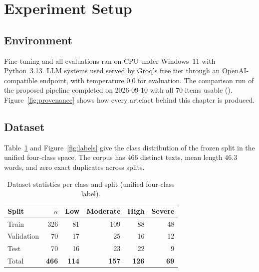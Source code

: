 
\section{Experiment Setup}
\subsection{Environment}
Fine-tuning and all evaluations ran on CPU under Windows~11 with Python~3.13. LLM systems used  served by Groq's free tier through an OpenAI-compatible endpoint, with temperature 0.0 for evaluation. The comparison run of the proposed pipeline completed on 2026-09-10 with all 70 items usable (). Figure~\ref{fig:provenance} shows how every artefact behind this chapter is produced.


\subsection{Dataset}
Table~\ref{tab:dataset} and Figure~\ref{fig:labels} give the class distribution of the frozen split in the unified four-class space. The corpus has 466 distinct texts, mean length 46.3 words, and zero exact duplicates across splits.

\begin{table}[ht]
	\centering
	\caption{Dataset statistics per class and split (unified four-class label).}
	\label{tab:dataset}
	\begin{tabular}{lrrrrr}
		\toprule
		Split      & $n$          & Low          & Moderate     & High         & Severe      \\ \midrule
		Train      & 326          & 81           & 109          & 88           & 48          \\
		Validation & 70           & 17           & 25           & 16           & 12          \\
		Test       & 70           & 16           & 23           & 22           & 9           \\ \midrule
		Total      & \textbf{466} & \textbf{114} & \textbf{157} & \textbf{126} & \textbf{69} \\ \bottomrule
	\end{tabular}
\end{table}

